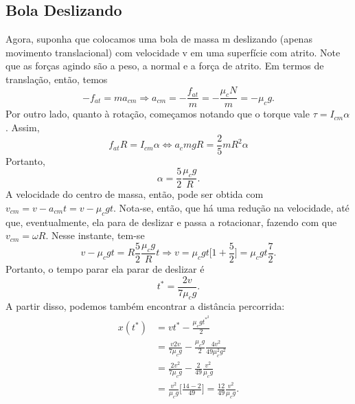 \documentclass[PhysicsII/physicsII_notes.tex]{subfiles}
\begin{document}
\subsection{Bola Deslizando}
Agora, suponha que colocamos uma bola de massa m deslizando (apenas movimento translacional) com velocidade v em uma superfície com atrito. Note que as forças agindo são
a peso, a normal e a força de atrito. Em termos de translação, então, temos
\[
	-f_{at} = ma_{cm} \Rightarrow a_{cm} = -\frac{f_{at}}{m} = -\frac{\mu_{c}N}{m} = -\mu_{c}g.
\]
Por outro lado, quanto à rotação, começamos notando que o torque vale \(\tau = I_{cm}\alpha \). Assim,
\[
	f_{at}R = I_{cm}\alpha \Longleftrightarrow a_{c}mgR = \frac{2}{5}mR^{2}\alpha
\]
Portanto,
\[
	\alpha = \frac{5}{2}\frac{\mu_{c}g}{R}.
\]
A velocidade do centro de massa, então, pode ser obtida com \(v_{cm} = v - a_{cm}t = v - \mu_{c}gt\). Nota-se, então,
que há uma redução na velocidade, até que, eventualmente, ela para de deslizar e passa a rotacionar, fazendo com que \(v_{cm} = \omega R\).
Nesse instante, tem-se
\[
	v-\mu_{c}gt = R\frac{5}{2}\frac{\mu_{c}g}{R}t \Rightarrow v = \mu_{c}gt\biggl[1+\frac{5}{2}\biggr] = \mu_{c}gt \frac{7}{2}.
\]
Portanto, o tempo parar ela parar de deslizar é
\[
	\boxed{t^{*} = \frac{2v}{7\mu_{c}g}.}
\]
A partir disso, podemos também encontrar a distância percorrida:
\begin{align*}
	x(t^{*}) & = vt^{*} - \frac{\mu_{c}gt^{*^{2}}}{2}                                                               \\
	         & = \frac{v2v}{7\mu_{c}g} - \frac{\mu_{c}g}{2}\frac{4v^{2}}{49\mu_{c}^{2}g^{2}}                        \\
	         & = \frac{2v^{2}}{7\mu_{c}g} - \frac{2}{49}\frac{v^{2}}{\mu_{c}g}                                      \\
	         & = \frac{v^{2}}{\mu_{c}g}\biggl[\frac{14-2}{49}\biggr] = \boxed{\frac{12}{49}\frac{v^{2}}{\mu_{c}g}.}
\end{align*}
\end{document}
